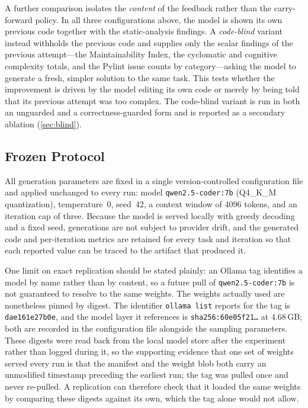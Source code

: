 A further comparison isolates the \emph{content} of the feedback rather than the
carry-forward policy. In all three configurations above, the model is shown its own
previous code together with the static-analysis findings. A \emph{code-blind}
variant instead withholds the previous code and supplies only the scalar findings
of the previous attempt---the Maintainability Index, the cyclomatic and cognitive
complexity totals, and the Pylint issue counts by category---asking the model to
generate a fresh, simpler solution to the same task. This tests whether the
improvement is driven by the model editing its own code or merely by being told
that its previous attempt was too complex. The code-blind variant is run in both an
unguarded and a correctness-guarded form and is reported as a secondary ablation
(\cref{sec:blind}).

\subsection{Frozen Protocol}
All generation parameters are fixed in a single version-controlled configuration
file and applied unchanged to every run: model \texttt{qwen2.5-coder:7b}
(Q4\_K\_M quantization), temperature~0, seed~42, a context window of 4096 tokens,
and an iteration cap of three. Because the model is served locally with greedy
decoding and a fixed seed, generations are not subject to provider drift, and the
generated code and per-iteration metrics are retained for every task and
iteration so that each reported value can be traced to the artifact that produced
it.

One limit on exact replication should be stated plainly: an Ollama tag identifies a
model by name rather than by content, so a future pull of \texttt{qwen2.5-coder:7b}
is not guaranteed to resolve to the same weights. The weights actually used are
nonetheless pinned by digest. The identifier \texttt{ollama list} reports for the
tag is \texttt{dae161e27b0e}, and the model layer it references is
\texttt{sha256:60e05f21\ldots} at 4.68\,GB; both are recorded in the configuration
file alongside the sampling parameters. These digests were read back from the local
model store after the experiment rather than logged during it, so the supporting
evidence that one set of weights served every run is that the manifest and the
weight blob both carry an unmodified timestamp preceding the earliest run; the tag
was pulled once and never re-pulled. A replication can therefore check that it
loaded the same weights by comparing these digests against its own, which the tag
alone would not allow.

